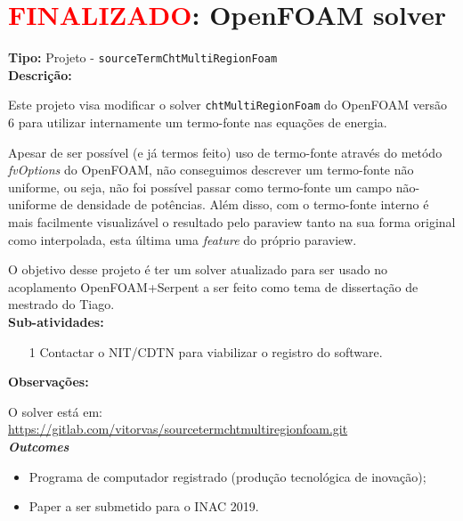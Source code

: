 \chapter{\textcolor{red}{FINALIZADO}: OpenFOAM solver} 

\textbf{Tipo:} Projeto - \texttt{sourceTermChtMultiRegionFoam}\\

\textbf{Descrição:}

Este projeto visa modificar o solver \texttt{chtMultiRegionFoam} do 
OpenFOAM versão 6 para utilizar internamente um termo-fonte nas equações 
de energia.

Apesar de ser possível (e já termos feito) uso de termo-fonte através do 
metódo \textit{fvOptions} do OpenFOAM, não conseguimos descrever um termo-fonte
não uniforme, ou seja, não foi possível passar como termo-fonte um campo não-uniforme
de densidade de potências. Além disso, com o termo-fonte interno é mais facilmente 
visualizável o resultado pelo paraview tanto na sua forma original como interpolada, esta
última uma \textit{feature} do próprio paraview.

O objetivo desse projeto é ter um solver atualizado para ser usado no acoplamento 
OpenFOAM+Serpent a ser feito como tema de dissertação de mestrado 
do Tiago.\\

\textbf{Sub-atividades:}

\begin{itemize}
  \item[1] Contactar o NIT/CDTN para viabilizar o registro do software.
\end{itemize}

\textbf{Observações:}

O solver está em:\\
 \url{https://gitlab.com/vitorvas/sourcetermchtmultiregionfoam.git}\\

\textbf{\textit{Outcomes}}

\begin{itemize}
	\item Programa de computador registrado (produção tecnológica de inovação);
	\item Paper a ser submetido para o INAC 2019.
\end{itemize}


